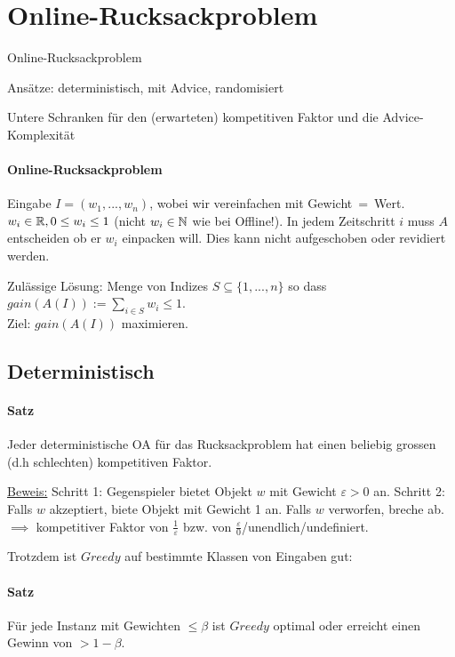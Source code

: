 \section{Online-Rucksackproblem}

\begin{takeaway}
    \item Online-Rucksackproblem
    \item Ansätze: deterministisch, mit Advice, randomisiert
    \item Untere Schranken für den (erwarteten) kompetitiven Faktor und die Advice-Komplexität
\end{takeaway}

\paragraph{Online-Rucksackproblem}
Eingabe $I=(w_1, ..., w_n)$, wobei wir vereinfachen mit \mbox{Gewicht = Wert}.
$w_i \in \mathbb{R}, 0 \leq w_i \leq 1$ (nicht $w_i \in \mathbb{N}$ wie bei Offline!).
In jedem Zeitschritt $i$ muss $A$ entscheiden ob er $w_i$ einpacken will.
Dies kann nicht aufgeschoben oder revidiert werden.

Zulässige Lösung: Menge von Indizes $S \subseteq \{1, ..., n\}$ so dass
$gain(A(I)) := \sum_{i \in S} w_i \leq 1$.
\\
Ziel: $gain(A(I))$ maximieren.


\subsection{Deterministisch}

\paragraph{Satz}
Jeder deterministische OA für das Rucksackproblem hat einen beliebig grossen (d.h schlechten)
kompetitiven Faktor.

\underline{Beweis:}
Schritt 1: Gegenspieler bietet Objekt $w$ mit Gewicht $\varepsilon > 0$ an.
Schritt 2: Falls $w$ akzeptiert, biete Objekt mit Gewicht 1 an. Falls $w$ verworfen, breche ab.
\\
$\implies$ kompetitiver Faktor von $\frac{1}{\varepsilon}$ bzw. von
$\frac{\varepsilon}{0}$/unendlich/undefiniert.

\vspace{5mm}

Trotzdem ist $Greedy$ auf bestimmte Klassen von Eingaben gut:

\paragraph{Satz}
Für jede Instanz mit Gewichten $\leq \beta$ ist $Greedy$ optimal oder erreicht einen Gewinn von $> 1-\beta$.

